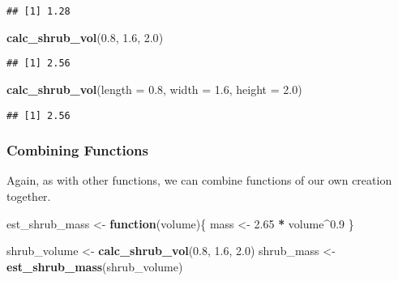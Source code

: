 \documentclass[
]{article}
\newenvironment{Shaded}{\begin{snugshade}}{\end{snugshade}}
\newcommand{\AttributeTok}[1]{\textcolor[rgb]{0.13,0.29,0.53}{#1}}
\newcommand{\ControlFlowTok}[1]{\textcolor[rgb]{0.13,0.29,0.53}{\textbf{#1}}}
\newcommand{\FloatTok}[1]{\textcolor[rgb]{0.00,0.00,0.81}{#1}}
\newcommand{\FunctionTok}[1]{\textcolor[rgb]{0.13,0.29,0.53}{\textbf{#1}}}
\newcommand{\NormalTok}[1]{#1}
\newcommand{\OtherTok}[1]{\textcolor[rgb]{0.56,0.35,0.01}{#1}}
\newcommand{\SpecialCharTok}[1]{\textcolor[rgb]{0.81,0.36,0.00}{\textbf{#1}}}
\begin{document}
\begin{verbatim}
## [1] 1.28
\end{verbatim}

\begin{Shaded}
\begin{Highlighting}[]
\FunctionTok{calc\_shrub\_vol}\NormalTok{(}\FloatTok{0.8}\NormalTok{, }\FloatTok{1.6}\NormalTok{, }\FloatTok{2.0}\NormalTok{)}
\end{Highlighting}
\end{Shaded}

\begin{verbatim}
## [1] 2.56
\end{verbatim}

\begin{Shaded}
\begin{Highlighting}[]
\FunctionTok{calc\_shrub\_vol}\NormalTok{(}\AttributeTok{length =} \FloatTok{0.8}\NormalTok{, }\AttributeTok{width =} \FloatTok{1.6}\NormalTok{, }\AttributeTok{height =} \FloatTok{2.0}\NormalTok{)}
\end{Highlighting}
\end{Shaded}

\begin{verbatim}
## [1] 2.56
\end{verbatim}

\hypertarget{combining-functions}{%
\subsubsection{Combining Functions}\label{combining-functions}}

Again, as with other functions, we can combine functions of our own
creation together.

\begin{Shaded}
\begin{Highlighting}[]
\NormalTok{est\_shrub\_mass }\OtherTok{\textless{}{-}} \ControlFlowTok{function}\NormalTok{(volume)\{}
\NormalTok{  mass }\OtherTok{\textless{}{-}} \FloatTok{2.65} \SpecialCharTok{*}\NormalTok{ volume}\SpecialCharTok{\^{}}\FloatTok{0.9}
\NormalTok{\}}

\NormalTok{shrub\_volume }\OtherTok{\textless{}{-}} \FunctionTok{calc\_shrub\_vol}\NormalTok{(}\FloatTok{0.8}\NormalTok{, }\FloatTok{1.6}\NormalTok{, }\FloatTok{2.0}\NormalTok{)}
\NormalTok{shrub\_mass }\OtherTok{\textless{}{-}} \FunctionTok{est\_shrub\_mass}\NormalTok{(shrub\_volume)}
\end{Highlighting}
\end{Shaded}
\end{document}

